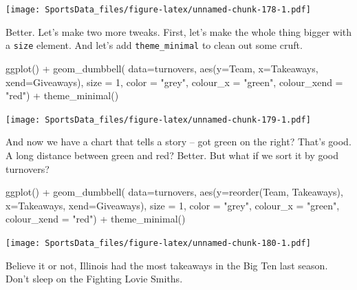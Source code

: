 \documentclass[
]{book}
\newenvironment{Shaded}{\begin{snugshade}}{\end{snugshade}}
\newcommand{\AttributeTok}[1]{\textcolor[rgb]{0.77,0.63,0.00}{#1}}
\newcommand{\DecValTok}[1]{\textcolor[rgb]{0.00,0.00,0.81}{#1}}
\newcommand{\FunctionTok}[1]{\textcolor[rgb]{0.00,0.00,0.00}{#1}}
\newcommand{\NormalTok}[1]{#1}
\newcommand{\SpecialCharTok}[1]{\textcolor[rgb]{0.00,0.00,0.00}{#1}}
\newcommand{\StringTok}[1]{\textcolor[rgb]{0.31,0.60,0.02}{#1}}
\begin{document}
\texttt{[image: SportsData\_files/figure-latex/unnamed-chunk-178-1.pdf]}

Better. Let's make two more tweaks. First, let's make the whole thing bigger with a \texttt{size} element. And let's add \texttt{theme\_minimal} to clean out some cruft.

\begin{Shaded}
\begin{Highlighting}[]
\FunctionTok{ggplot}\NormalTok{() }\SpecialCharTok{+} 
  \FunctionTok{geom\_dumbbell}\NormalTok{(}
    \AttributeTok{data=}\NormalTok{turnovers, }
    \FunctionTok{aes}\NormalTok{(}\AttributeTok{y=}\NormalTok{Team, }\AttributeTok{x=}\NormalTok{Takeaways, }\AttributeTok{xend=}\NormalTok{Giveaways),}
    \AttributeTok{size =} \DecValTok{1}\NormalTok{,}
    \AttributeTok{color =} \StringTok{"grey"}\NormalTok{,}
    \AttributeTok{colour\_x =} \StringTok{"green"}\NormalTok{,}
    \AttributeTok{colour\_xend =} \StringTok{"red"}\NormalTok{) }\SpecialCharTok{+} 
  \FunctionTok{theme\_minimal}\NormalTok{()}
\end{Highlighting}
\end{Shaded}

\texttt{[image: SportsData\_files/figure-latex/unnamed-chunk-179-1.pdf]}

And now we have a chart that tells a story -- got green on the right? That's good. A long distance between green and red? Better. But what if we sort it by good turnovers?

\begin{Shaded}
\begin{Highlighting}[]
\FunctionTok{ggplot}\NormalTok{() }\SpecialCharTok{+} 
  \FunctionTok{geom\_dumbbell}\NormalTok{(}
    \AttributeTok{data=}\NormalTok{turnovers, }
    \FunctionTok{aes}\NormalTok{(}\AttributeTok{y=}\FunctionTok{reorder}\NormalTok{(Team, Takeaways), }\AttributeTok{x=}\NormalTok{Takeaways, }\AttributeTok{xend=}\NormalTok{Giveaways),}
    \AttributeTok{size =} \DecValTok{1}\NormalTok{,}
    \AttributeTok{color =} \StringTok{"grey"}\NormalTok{,}
    \AttributeTok{colour\_x =} \StringTok{"green"}\NormalTok{,}
    \AttributeTok{colour\_xend =} \StringTok{"red"}\NormalTok{) }\SpecialCharTok{+} 
  \FunctionTok{theme\_minimal}\NormalTok{()}
\end{Highlighting}
\end{Shaded}

\texttt{[image: SportsData\_files/figure-latex/unnamed-chunk-180-1.pdf]}

Believe it or not, Illinois had the most takeaways in the Big Ten last season. Don't sleep on the Fighting Lovie Smiths.
\end{document}
